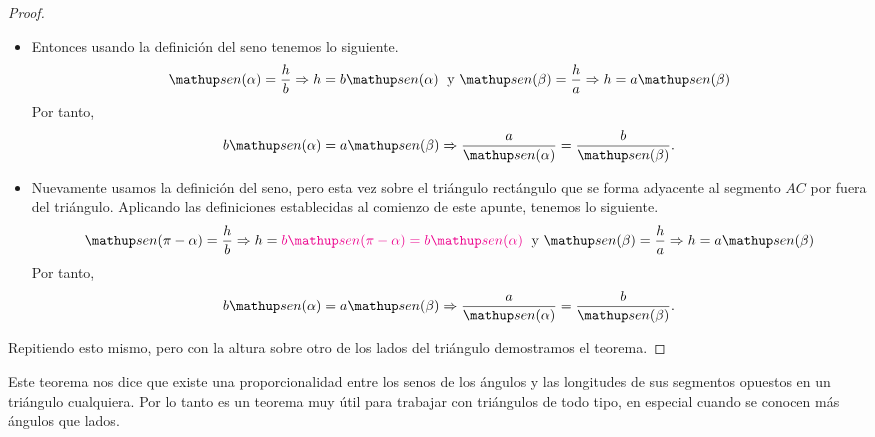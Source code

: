 \begin{proof}
\begin{itemize}
\item[($\alpha$ agudo)]
Entonces usando la definición del seno tenemos lo siguiente.
\[
\sen(\alpha) = \frac h b \dw h = b\sen(\alpha)\;\text{ y }\sen(\beta) = \frac h a \dw h = a\sen(\beta)
\]
Por tanto,
\[
b\sen(\alpha) = a\sen(\beta) \dw \frac{a}{\sen(\alpha)} = \frac{b}{\sen(\beta)}.
\]
\item[($\alpha$ obtuso)]
Nuevamente usamos la definición del seno, pero esta vez sobre el triángulo rectángulo que se forma adyacente al segmento $AC$ por fuera del triángulo.
Aplicando las definiciones establecidas al comienzo de este apunte, tenemos lo siguiente.
\[
\sen(\pi-\alpha) = \frac h b \dw h = \color{magenta}{b\sen(\pi-\alpha)= b\sen(\alpha)}\;\color{black}\text{ y }\sen(\beta) = \frac h a \dw h = a\sen(\beta)
\]
Por tanto,
\[
b\sen(\alpha) = a\sen(\beta) \dw \frac{a}{\sen(\alpha)} = \frac{b}{\sen(\beta)}.
\]
\end{itemize}
Repitiendo esto mismo, pero con la altura sobre otro de los lados del tri\'angulo demostramos el teorema.
\end{proof}	
Este teorema nos dice que existe una proporcionalidad entre los senos de los ángulos y las longitudes de sus segmentos opuestos en un triángulo cualquiera. Por lo tanto es un teorema muy útil para trabajar con triángulos de todo tipo, en especial cuando se conocen más ángulos que lados.


